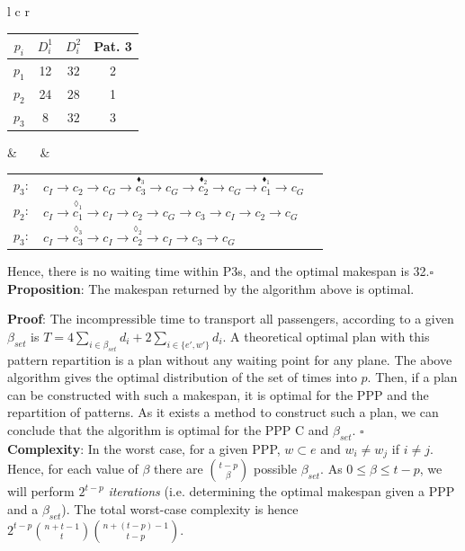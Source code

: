 \documentclass{llncs}
\newcommand{\alexcomment}[1]{{\bf \textcolor{blue}{#1}}}
\begin{document}
\begin{center}
\begin{tabular}{l c r}

\begin{tabular}{|c | c | c | c|}
    \hline
    $p_i$ & $D^1_i$ & $D^2_i$ & Pat. 3 \tabularnewline
    \hline
    $p_1$ & 12 & $32$ & 2 \tabularnewline
    $p_2$ & 24 & $28$ & 1 \tabularnewline
    $p_3$ &  8 & $32$ & 3 \tabularnewline
    \hline
\end{tabular} & ~~ &
\begin{tabular}{c l l}
    $p_3:$ & $c_I \to c_2 \to c_G \to \overset{\blacklozenge_3}{c_3} \to c_G \to \overset{\blacklozenge_2}{c_2} \to c_G \to \overset{\blacklozenge_1}{c_1} \to c_G$\tabularnewline
    $p_2:$ & $c_I \to \overset{\lozenge_1}{c_1} \to c_I \to c_2 \to c_G \to c_3 \to c_I \to c_2 \to c_G$\tabularnewline
    $p_3:$ & $c_I \to \overset{\lozenge_3}{c_3} \to c_I \to \overset{\lozenge_2}{c_2} \to c_I \to c_3 \to c_G$\tabularnewline
\end{tabular}

\end{tabular}
\end{center}
Hence, there is no waiting time within P3s, and the optimal makespan is 32.\hfill $\square$\\

\noindent
{\bf Proposition}: The makespan returned by the algorithm above is optimal.

{\bf Proof}: The incompressible time to transport all passengers, according to a given $\beta_{set}$ is $T = 4\underset{i\in \beta_{set}}{\sum} d_i + 2\underset{i\in \{ e',w' \}}{\sum} d_i$. A theoretical optimal plan with this pattern repartition is a plan without any waiting point for any plane.
The above algorithm gives the optimal distribution of the set of times into $p$. Then, if a plan can be constructed with such a makespan, it is optimal for the PPP and the repartition of patterns.
As it exists a method to construct such a plan, we can conclude that the algorithm is optimal for the PPP C and $\beta_{set}$. %
\hfill $\square$\\

\noindent
{\bf Complexity}: In the worst case, for a given PPP, $w \subset e$ and $w_i \neq w_j$ if $i\neq j$. Hence, for each value of $\beta$ there are ${t-p \choose \beta}$ possible $\beta_{set}$. As $0 \leq \beta \leq t-p$, we will perform $2^{t-p}$ {\em iterations} (i.e. determining the optimal makespan given a PPP and a $\beta_{set}$). The total worst-case complexity is hence $2^{t-p} {n+t-1 \choose t}{n+(t-p)-1 \choose t-p}$. 
\end{document}

